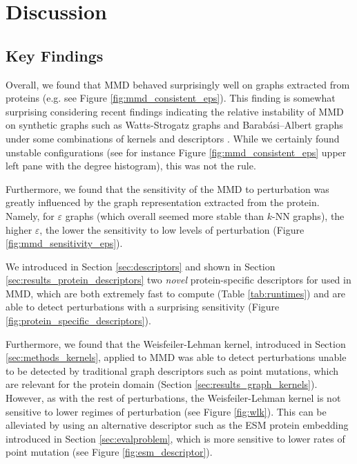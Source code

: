\chapter{Discussion}\label{chap:discussion}


\section{Key Findings}\label{sec:key_findings}

Overall, we found that MMD behaved surprisingly well on graphs extracted from
proteins (e.g. see Figure \ref{fig:mmd_consistent_eps}). This finding is
somewhat surprising considering recent findings indicating the relative
instability of MMD on synthetic graphs such as Watts-Strogatz graphs and
Barabási–Albert graphs under some combinations of kernels and descriptors
\citep{o2021evaluation}. While we certainly found unstable configurations
(see for instance Figure \ref{fig:mmd_consistent_eps} upper left pane with the degree histogram),
this was not the rule.

Furthermore, we found that the sensitivity of the MMD to perturbation was
greatly influenced by the graph representation extracted from the protein.
Namely, for $\varepsilon$ graphs (which overall seemed more stable than $k$-NN
graphs), the higher $\varepsilon$, the lower the sensitivity to low levels of
perturbation (Figure \ref{fig:mmd_sensitivity_eps}).

We introduced in Section \ref{sec:descriptors} and shown in Section
\ref{sec:results_protein_descriptors} two \emph{novel} protein-specific descriptors for
used in MMD, which are both extremely fast to compute (Table \ref{tab:runtimes})
and are able to detect perturbations with a surprising sensitivity (Figure
\ref{fig:protein_specific_descriptors}).

Furthermore, we found that the Weisfeiler-Lehman kernel, introduced in Section
\ref{sec:methods_kernels}, applied to MMD was able to detect perturbations
unable to be detected by traditional graph descriptors such as point mutations,
which are relevant for the protein domain (Section
\ref{sec:results_graph_kernels}). However, as with the rest of perturbations,
the Weisfeiler-Lehman kernel is not sensitive to lower regimes of perturbation
(see Figure \ref{fig:wlk}).
This can be alleviated by using an alternative descriptor such as the ESM
protein embedding introduced in Section \ref{sec:evalproblem}, which is more
sensitive to lower rates of point mutation (see Figure
\ref{fig:esm_descriptor}).

